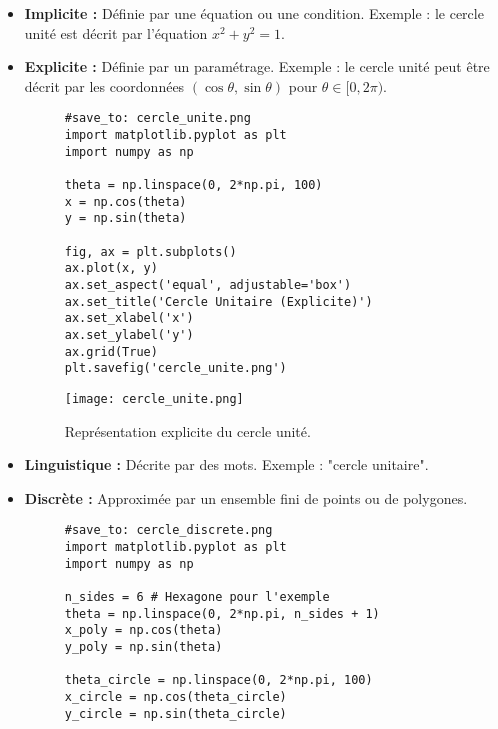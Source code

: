 \documentclass{article}
\begin{document}
\begin{itemize}
    \item \textbf{Implicite :} Définie par une équation ou une condition. Exemple : le cercle unité est décrit par l'équation $x^2 + y^2 = 1$.
    \item \textbf{Explicite :} Définie par un paramétrage. Exemple : le cercle unité peut être décrit par les coordonnées $(\cos\theta, \sin\theta)$ pour $\theta \in [0, 2\pi)$.
    \begin{figure}[H]
        \centering
        \begin{verbatim}
#save_to: cercle_unite.png
import matplotlib.pyplot as plt
import numpy as np

theta = np.linspace(0, 2*np.pi, 100)
x = np.cos(theta)
y = np.sin(theta)

fig, ax = plt.subplots()
ax.plot(x, y)
ax.set_aspect('equal', adjustable='box')
ax.set_title('Cercle Unitaire (Explicite)')
ax.set_xlabel('x')
ax.set_ylabel('y')
ax.grid(True)
plt.savefig('cercle_unite.png')
        \end{verbatim}
        \texttt{[image: cercle\_unite.png]}
        \caption{Représentation explicite du cercle unité.}
        \label{fig:cercle_unite}
    \end{figure}
    \item \textbf{Linguistique :} Décrite par des mots. Exemple : "cercle unitaire".
    \item \textbf{Discrète :} Approximée par un ensemble fini de points ou de polygones.
    \begin{figure}[H]
        \centering
        \begin{verbatim}
#save_to: cercle_discrete.png
import matplotlib.pyplot as plt
import numpy as np

n_sides = 6 # Hexagone pour l'exemple
theta = np.linspace(0, 2*np.pi, n_sides + 1)
x_poly = np.cos(theta)
y_poly = np.sin(theta)

theta_circle = np.linspace(0, 2*np.pi, 100)
x_circle = np.cos(theta_circle)
y_circle = np.sin(theta_circle)


\end{verbatim}
\end{figure}
\end{itemize}
\end{document}
